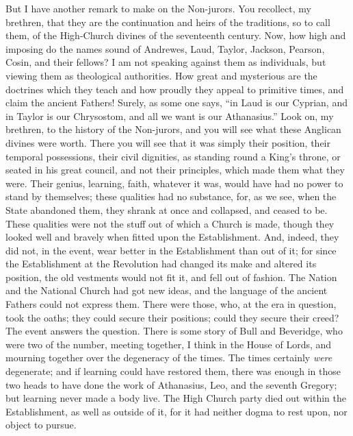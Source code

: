 But I have another remark to make on the Non-jurors. You recollect,
my brethren, that they are the continuation and heirs of the
traditions, so to call them, of the High-Church divines of the
seventeenth century. Now, how high and imposing do the names sound of
Andrewes, Laud, Taylor, Jackson, Pearson, Cosin, and their fellows? I
am not speaking against them as individuals, but viewing them as
theological authorities. How great and mysterious are the doctrines
which they teach and how proudly they appeal to primitive times, and
claim the ancient Fathers! Surely, as some one says, ``in Laud is
our Cyprian, and in Taylor is our Chrysostom, and all we want is our
Athanasius.'' Look on, my brethren, to the history of the
Non-jurors, and you will see what these Anglican divines were worth.
There you will see that it was simply their position, their temporal
possessions, their civil dignities, as standing round a King's throne,
or seated in his great council, and not their principles, which made
them what they were. Their genius, learning, faith, whatever it was,
would have had no power to stand by themselves; these qualities had no
substance, for, as we see, when the State abandoned them, they shrank
at once and collapsed, and ceased to be. These qualities were not the
stuff out of which a Church is made, though they looked well and
bravely when fitted upon the Establishment. And, indeed, they did not,
in the event, wear better in the Establishment than out of it; for
since the Establishment at the Revolution had changed its make and
altered its position, the old vestments would not fit it, and fell out
of fashion. The Nation and the National Church had got new ideas, and
the language of the ancient Fathers could not express them. There were
those, who, at the era in question, took the oaths; they could secure
their positions; could they secure their creed? The event answers the
question. There is some story of Bull and Beveridge, who were two of
the number, meeting together, I think in the House of Lords, and
mourning together over the degeneracy of the times. The times
certainly \emph{were} degenerate; and if learning could have restored
them, there was enough in those two heads to have done the work of
Athanasius, Leo, and the seventh Gregory; but learning never made a
body live. The High Church party died out within the Establishment, as
well as outside of it, for it had neither dogma to rest upon, nor
object to pursue.


